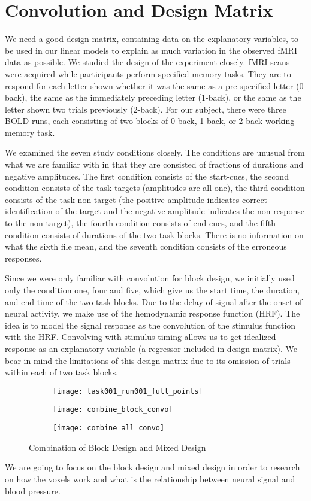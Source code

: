 \section{Convolution and Design Matrix}

We need a good design matrix, containing data on the explanatory variables, to
be used in our linear models to explain as much variation in the observed fMRI
data as possible. We studied the design of the experiment closely. fMRI scans were
acquired while participants perform specified memory tasks. They are to respond
for each letter shown whether it was the same as a pre-specified letter
(0-back), the same as the immediately preceding letter (1-back), or the same as
the letter shown two trials previously (2-back). For our subject, there were
three BOLD runs, each consisting of two blocks of 0-back, 1-back, or 2-back
working memory task. 

We examined the seven study conditions closely. The conditions are unusual from
what we are familiar with in that they are consisted of fractions of durations
and negative amplitudes. The first condition consists of
the start-cues, the second condition consists of the task targets (amplitudes
are all one), the third condition consists of the task non-target (the positive amplitude 
indicates correct identification of the target and the negative amplitude indicates the
non-response to the non-target), the fourth condition consists of end-cues, and
the fifth condition consists of durations of the two task blocks. There is no
information on what the sixth file mean, and the seventh condition consists of
the erroneous responses.

Since we were only familiar with convolution for block design, we initially used
only the condition one, four and five, which give us the start time, the
duration, and end time of the two task blocks. Due to the delay of signal after
the onset of neural activity, we make use of the hemodynamic response
function (HRF). The idea is to model the signal response as the convolution of
the stimulus function with the HRF. Convolving with stimulus timing allows us to
get idealized response as an explanatory variable (a regressor included in
design matrix). We bear in mind the limitations of this
design matrix due to its omission of trials within each of two task blocks. 

\begin{figure}[!h]
\centering
\begin{subfigure}{.33\textwidth}
  \texttt{[image: task001\_run001\_full\_points]}
\end{subfigure}%
\begin{subfigure}{.33\textwidth}
  \texttt{[image: combine\_block\_convo]}
\end{subfigure}%
\begin{subfigure}{.33\textwidth}
  \texttt{[image: combine\_all\_convo]}
  \centering
\end{subfigure}
\caption{Combination of Block Design and Mixed Design\label{fig:Comb}}
\end{figure}

We are going to focus on the block design and mixed design in order to research
on how the voxels work and what is the relationship between neural signal and 
blood pressure.
